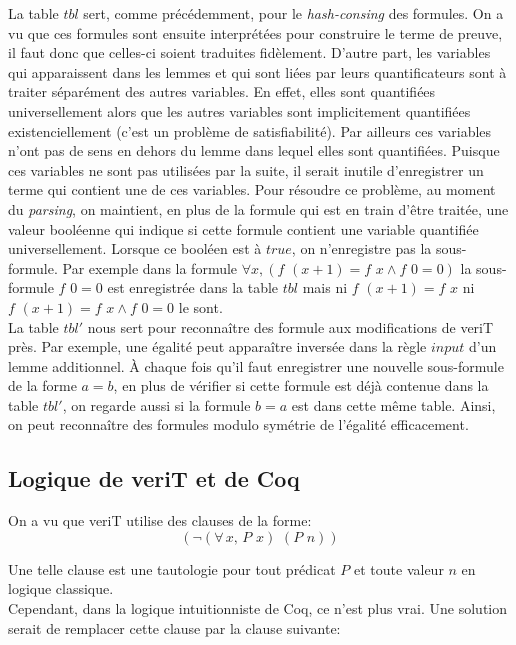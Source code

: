 \documentclass[11pt]{article}
\begin{document}
La table $tbl$ sert, comme précédemment, pour le \textit{hash-consing} des formules. On a vu que ces formules sont ensuite interprétées pour construire le terme de preuve, il faut donc que celles-ci soient traduites fidèlement. D'autre part, les variables qui apparaissent dans les lemmes et qui sont liées par leurs quantificateurs sont à traiter séparément des autres variables. En effet, elles sont quantifiées universellement alors que les autres variables sont implicitement quantifiées existenciellement (c'est un problème de satisfiabilité). Par ailleurs ces variables n'ont pas de sens en dehors du lemme dans lequel elles sont quantifiées. Puisque ces variables ne sont pas utilisées par la suite, il serait inutile d'enregistrer un terme qui contient une de ces variables.
Pour résoudre ce problème, au moment du \textit{parsing}, on maintient, en plus de la formule qui est en train d'être traitée, une valeur booléenne qui indique si cette formule contient une variable quantifiée universellement. Lorsque ce booléen est à $true$, on n'enregistre pas la sous-formule. Par exemple dans la formule $\forall x, (f \,\, (x+1) = f \,\, x \wedge f\,\,0 = 0)$ la sous-formule $f \,\, 0 = 0$ est enregistrée dans la table $tbl$ mais ni $f\,\,(x+1) = f\,\,x$ ni $f \,\, (x+1) = f \,\, x \wedge f\,\,0 = 0$ le sont.\\

La table $tbl'$ nous sert pour reconnaître des formule aux modifications de veriT près. Par exemple, une égalité  peut apparaître inversée  dans la règle $input$ d'un lemme additionnel. À chaque fois qu'il faut enregistrer une nouvelle sous-formule de la forme $a = b$, en plus de vérifier si cette formule est déjà contenue dans la table $tbl'$, on regarde aussi si la formule $b = a$ est dans cette même table. Ainsi, on peut reconnaître des formules modulo symétrie de l'égalité efficacement.

\subsection{Logique de veriT et de Coq}
On a vu que veriT utilise des clauses de la forme: 
\[  (\neg (\forall \, x, \, P \,\, x) \,\, (P \,\, n)) \]

Une telle clause est une tautologie pour tout prédicat $P$ et toute valeur $n$ en logique classique. \\

Cependant, dans la logique intuitionniste de Coq, ce n'est plus vrai. Une solution serait de remplacer cette clause par la clause suivante:
\end{document}
